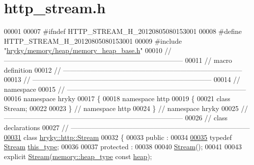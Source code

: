 \hypertarget{http__stream_8h_source}{\section{http\-\_\-stream.\-h}
}

\begin{DoxyCode}
00001 
00007 \textcolor{preprocessor}{#ifndef HTTP\_STREAM\_H\_20120805080153001}
00008 \textcolor{preprocessor}{}\textcolor{preprocessor}{#define HTTP\_STREAM\_H\_20120805080153001}
00009 \textcolor{preprocessor}{}\textcolor{preprocessor}{#include "\hyperlink{memory__heap__base_8h}{hryky/memory/heap/memory_heap_base.h}"}
00010 \textcolor{comment}{//
      ------------------------------------------------------------------------------}
00011 \textcolor{comment}{// macro definition}
00012 \textcolor{comment}{//
      ------------------------------------------------------------------------------}
00013 \textcolor{comment}{//
      ------------------------------------------------------------------------------}
00014 \textcolor{comment}{// namespace}
00015 \textcolor{comment}{//
      ------------------------------------------------------------------------------}
00016 \textcolor{keyword}{namespace }hryky
00017 \{
00018 \textcolor{keyword}{namespace }http
00019 \{
00021     \textcolor{keyword}{class }Stream;
00022 
00023 \} \textcolor{comment}{// namespace http}
00024 \} \textcolor{comment}{// namespace hryky}
00025 \textcolor{comment}{//
      ------------------------------------------------------------------------------}
00026 \textcolor{comment}{// class declarations}
00027 \textcolor{comment}{//
      ------------------------------------------------------------------------------}
\hypertarget{http__stream_8h_source_l00031}{}\hyperlink{classhryky_1_1http_1_1_stream}{00031} \textcolor{comment}{}\textcolor{keyword}{class }\hyperlink{classhryky_1_1http_1_1_stream}{hryky::http::Stream}
00032 \{
00033 \textcolor{keyword}{public} :
00034 
\hypertarget{http__stream_8h_source_l00035}{}\hyperlink{classhryky_1_1http_1_1_stream_ab09386542f788b82fc59357ed62093ed}{00035}     \textcolor{keyword}{typedef} \hyperlink{classhryky_1_1http_1_1_stream}{Stream}              \hyperlink{classhryky_1_1http_1_1_stream_ab09386542f788b82fc59357ed62093ed}{this_type};
00036 
00037 \textcolor{keyword}{protected} :
00038 
00040     \hyperlink{classhryky_1_1http_1_1_stream_aa5ad1f5164b2bbfe98eec63a9553d2eb}{Stream}();
00041 
00043     \textcolor{keyword}{explicit} \hyperlink{classhryky_1_1http_1_1_stream_aa5ad1f5164b2bbfe98eec63a9553d2eb}{Stream}(\hyperlink{classhryky_1_1memory_1_1heap_1_1_base}{memory::heap_type} \textcolor{keyword}{const} \hyperlink{namespacehryky_1_1memory_1_1global_a6fc6103f67c837aa0f39b359588409cd}{heap});

\end{DoxyCode}
